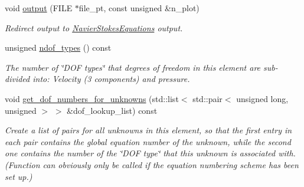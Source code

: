 \begin{DoxyCompactItemize}
void \hyperlink{classoomph_1_1AxisymmetricQCrouzeixRaviartElement_a04743e5848f04627a7069879f4da8389}{output} (F\+I\+LE $\ast$file\+\_\+pt, const unsigned \&n\+\_\+plot)
\begin{DoxyCompactList}\small\item\em Redirect output to \hyperlink{classoomph_1_1NavierStokesEquations}{Navier\+Stokes\+Equations} output. \end{DoxyCompactList}\item 
unsigned \hyperlink{classoomph_1_1AxisymmetricQCrouzeixRaviartElement_a85c8740ef4dd17626ae47c9344e15ae8}{ndof\+\_\+types} () const
\begin{DoxyCompactList}\small\item\em The number of \char`\"{}\+D\+O\+F types\char`\"{} that degrees of freedom in this element are sub-\/divided into\+: Velocity (3 components) and pressure. \end{DoxyCompactList}\item 
void \hyperlink{classoomph_1_1AxisymmetricQCrouzeixRaviartElement_a83a50021a007f1a932fe841119d93412}{get\+\_\+dof\+\_\+numbers\+\_\+for\+\_\+unknowns} (std\+::list$<$ std\+::pair$<$ unsigned long, unsigned $>$ $>$ \&dof\+\_\+lookup\+\_\+list) const
\begin{DoxyCompactList}\small\item\em Create a list of pairs for all unknowns in this element, so that the first entry in each pair contains the global equation number of the unknown, while the second one contains the number of the \char`\"{}\+D\+O\+F type\char`\"{} that this unknown is associated with. (Function can obviously only be called if the equation numbering scheme has been set up.) \end{DoxyCompactList}\end{DoxyCompactItemize}
